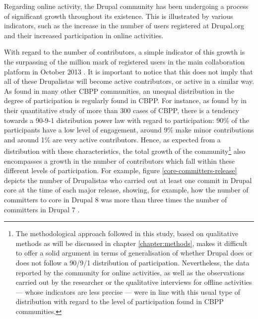 Regarding online activity, the Drupal community has been undergoing a process of significant growth throughout its existence. This is illustrated by various indicators, such as the increase in the number of users registered at Drupal.org and their increased participation in online activities.

With regard to the number of contributors, a simple indicator of this growth is the surpassing of the million mark of registered users in the main collaboration platform in October 2013 \parencite{drupalorg-1-million:2016:Online}. It is important to notice that this does not imply that all of these Drupalistas will become active contributors, or active in a similar way. As found in many other CBPP communities, an unequal distribution in the degree of participation is regularly found in CBPP. For instance, as found by \textcite{p2pvalue-del12:Online} in their quantitative study of more than 300 cases of CBPP, there is a tendency towards a 90-9-1 distribution power law with regard to participation: 90\% of the participants have a low level of engagement, around 9\% make minor contributions and around 1\% are very active contributors. Hence, as expected from a distribution with these characteristics, the total growth of the community\footnote{The methodological approach followed in this study, based on qualitative methods as will be discussed in chapter \ref{chapter:methods}, makes it difficult to offer a solid argument in terms of generalisation of whether Drupal does or does not follow a 90/9/1 distribution of participation. Nevertheless, the data reported by the community for online activities, as well as the observations carried out by the researcher or the qualitative interviews for offline activities --- whose indicators are less precise ---  were in line with this usual type of distribution with regard to the level of participation found in CBPP communities.} also encompasses a growth in the number of contributors which fall within these different levels of participation. For example, figure \ref{core-committers-release} depicts the number of Drupalistas who carried out at least one commit in Drupal core at the time of each major release, showing, for example, how the number of committers to core in Drupal 8 was more than three times the number of committers in Drupal 7 \parencite{drupal-cores:2016:Online, drupal7-core:2016:Online}.

